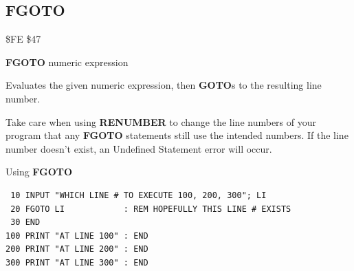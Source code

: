 \subsection{FGOTO}
\begin{description}[leftmargin=2cm,style=nextline]
\item [Token:]    \$FE \$47
\item [Format:]   {\bf FGOTO} numeric expression
\item [Usage:]    Evaluates the given numeric expression, then {\bf GOTO}s to the resulting line number.

\item [Remarks:]  Take care when using {\bf RENUMBER} to change the line numbers of your program that any {\bf FGOTO} statements still use the intended numbers. If the line number doesn't exist, an Undefined Statement error will occur.

\item [Example:]  Using {\bf FGOTO}

\begin{tcolorbox}[colback=black,coltext=white]
\verbatimfont{\codefont}
\begin{verbatim}
 10 INPUT "WHICH LINE # TO EXECUTE 100, 200, 300"; LI
 20 FGOTO LI            : REM HOPEFULLY THIS LINE # EXISTS
 30 END
100 PRINT "AT LINE 100" : END
200 PRINT "AT LINE 200" : END
300 PRINT "AT LINE 300" : END
\end{verbatim}
\end{tcolorbox}
\end{description}


\newpage
